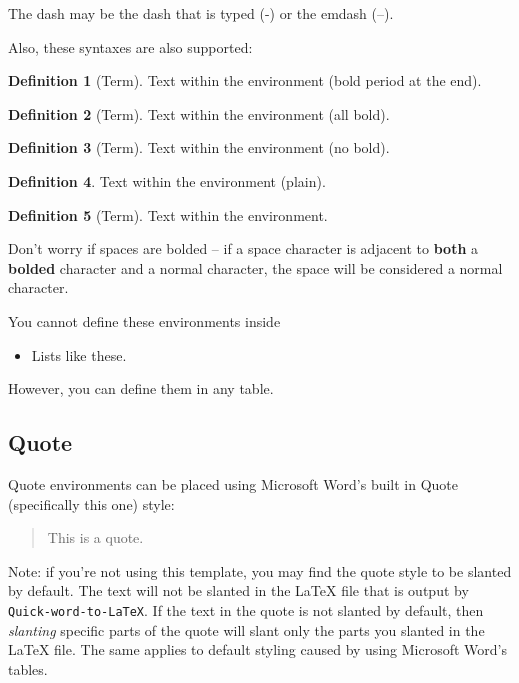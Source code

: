 \documentclass[
]{article}
\theoremstyle{plain}
\theoremstyle{remark}
\theoremstyle{definition}
\newtheorem{definition}{Definition}[section]  %
\begin{document}
The dash may be the dash that is typed (-) or the emdash (--).

Also, these syntaxes are also supported:

\begin{framed}

\begin{definition}[Term]
Text within the environment (bold
period at the end).
\end{definition}

\begin{definition}[Term]
Text within the environment (all bold).
\end{definition}

\begin{definition}[Term]
Text within the environment (no bold).
\end{definition}

\begin{definition}
Text within the environment (plain).
\end{definition}

\begin{definition}[Term]
Text within the environment.
\end{definition}

\end{framed}



Don't worry if spaces are bolded -- if a space character is adjacent to
\textbf{both} a \textbf{bolded} character and a normal character, the
space will be considered a normal character.

You cannot define these environments inside

\begin{itemize}
\item
  Lists like these.
\end{itemize}

However, you can define them in any table.


\subsection{Quote}

Quote environments can be placed using Microsoft Word's built in Quote
(specifically this one) style:

\begin{quote}
This is a quote.
\end{quote}

Note: if you're not using this template, you may find the quote style to
be slanted by default. The text will not be slanted in the LaTeX file
that is output by \texttt{Quick-word-to-LaTeX}. If the text in the quote
is not slanted by default, then \emph{slanting} specific parts of the
quote will slant only the parts you slanted in the LaTeX file. The same
applies to default styling caused by using Microsoft Word's tables.
\end{document}
